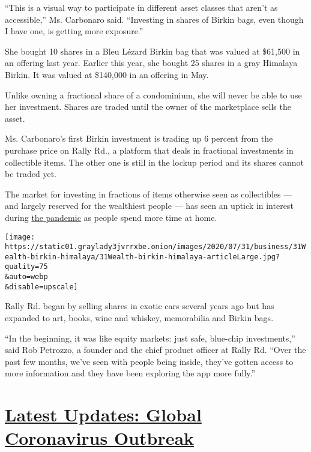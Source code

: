 ``This is a visual way to participate in different asset classes that
aren't as accessible,'' Ms. Carbonaro said. ``Investing in shares of
Birkin bags, even though I have one, is getting more exposure.''

She bought 10 shares in a Bleu Lézard Birkin bag that was valued at
\$61,500 in an offering last year. Earlier this year, she bought 25
shares in a gray Himalaya Birkin. It was valued at \$140,000 in an
offering in May.

Unlike owning a fractional share of a condominium, she will never be
able to use her investment. Shares are traded until the owner of the
marketplace sells the asset.

Ms. Carbonaro's first Birkin investment is trading up 6 percent from the
purchase price on Rally Rd., a platform that deals in fractional
investments in collectible items. The other one is still in the lockup
period and its shares cannot be traded yet.

The market for investing in fractions of items otherwise seen as
collectibles --- and largely reserved for the wealthiest people --- has
seen an uptick in interest during
\href{https://www.nytimes3xbfgragh.onion/news-event/coronavirus}{the
pandemic} as people spend more time at home.

\texttt{[image: https://static01.graylady3jvrrxbe.onion/images/2020/07/31/business/31Wealth-birkin-himalaya/31Wealth-birkin-himalaya-articleLarge.jpg?quality=75\\\&auto=webp\\\&disable=upscale]}

Rally Rd. began by selling shares in exotic cars several years ago but
has expanded to art, books, wine and whiskey, memorabilia and Birkin
bags.

``In the beginning, it was like equity markets: just safe, blue-chip
investments,'' said Rob Petrozzo, a founder and the chief product
officer at Rally Rd. ``Over the past few months, we've seen with people
being inside, they've gotten access to more information and they have
been exploring the app more fully.''

\hypertarget{latest-updates-global-coronavirus-outbreak}{%
\section{\texorpdfstring{\href{https://www.nytimes3xbfgragh.onion/2020/08/04/world/coronavirus-cases.html?action=click\&pgtype=Article\&state=default\&region=MAIN_CONTENT_1\&context=storylines_live_updates}{Latest
Updates: Global Coronavirus
Outbreak}}{Latest Updates: Global Coronavirus Outbreak}}\label{latest-updates-global-coronavirus-outbreak}}


